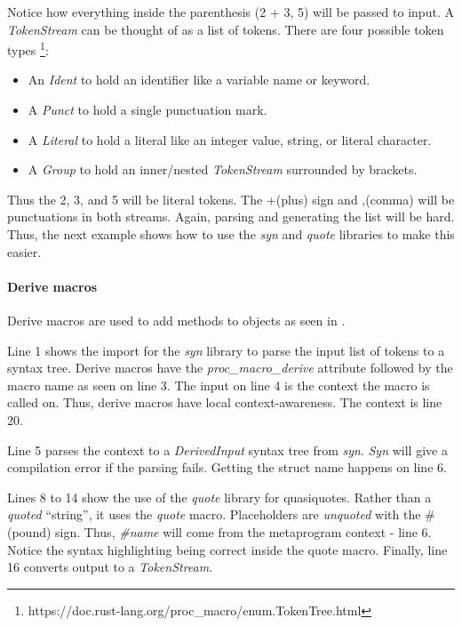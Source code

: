 Notice how everything inside the parenthesis (\colorbox{input}{2 + 3, 5}) will be passed to \colorbox{input}{input}.
A \textit{TokenStream} can be thought of as a list of tokens.
There are four possible token types \footnote{https://doc.rust-lang.org/proc\_macro/enum.TokenTree.html}:

\begin{itemize}
	\item An \textit{Ident} to hold an identifier like a variable name or keyword.
	\item A \textit{Punct} to hold a single punctuation mark.
	\item A \textit{Literal} to hold a literal like an integer value, string, or literal character.
	\item A \textit{Group} to hold an inner/nested \textit{TokenStream} surrounded by brackets.
\end{itemize}

Thus the 2, 3, and 5 will be literal tokens.
The +(plus) sign and ,(comma) will be punctuations in both streams.
Again, parsing and generating the list will be hard.
Thus, the next example shows how to use the \textit{syn} and \textit{quote} libraries to make this easier.

\paragraph{Derive macros}
Derive macros are used to add methods to objects as seen in .


Line 1 shows the import for the \textit{syn} library to parse the input list of tokens to a syntax tree.
Derive macros have the \textit{proc\_macro\_derive} attribute followed by the macro \colorbox{function}{name} as seen on line 3.
The \colorbox{context}{input} on line 4 is the context the macro is called on.
Thus, derive macros have local context-awareness.
The \colorbox{context}{context} is line 20.

Line 5 parses the context to a \textit{DerivedInput} syntax tree from \textit{syn}.
\textit{Syn} will give a compilation error if the parsing fails.
Getting the struct name happens on line 6.

Lines 8 to 14 show the use of the \textit{quote} library for quasiquotes.
Rather than a \textit{quoted} ``string'', it uses the \textit{quote} macro.
Placeholders are \textit{unquoted} with the \# (pound) sign.
Thus, \textit{\#name} will come from the metaprogram context - line 6.
Notice the syntax highlighting being correct inside the quote macro.
Finally, line 16 converts output to a \textit{TokenStream}.

